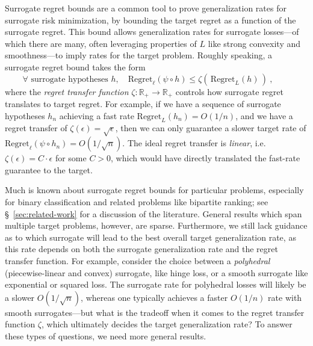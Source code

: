 \documentclass{article}
\theoremstyle{definition}\newtheorem{definition}{Definition}
\theoremstyle{definition}\newtheorem{assumption}{Assumption}
\newcommand{\reals}{\mathbb{R}}
\newcommand{\Reg}{\mathrm{Regret}}
\begin{document}
Surrogate regret bounds are a common tool to prove generalization rates for surrogate risk minimization, by bounding the target regret as a function of the surrogate regret.
This bound allows generalization rates for surrogate losses---of which there are many, often leveraging properties of $L$ like strong convexity and smoothness---to imply rates for the target problem.
Roughly speaking, a surrogate regret bound takes the form
\begin{equation}
  \label{eq:surrogate-regret-bound-informal}
  \forall \text{ surrogate hypotheses } h, \quad \Reg_\ell(\psi\circ h) \leq \zeta(\, \Reg_L(h) \,)~,\qquad
\end{equation}
where the \emph{regret transfer function} $\zeta : \reals_+ \to \reals_+$ controls how surrogate regret translates to target regret.
For example, if we have a sequence of surrogate hypotheses $h_n$ achieving a fast rate $\Reg_L(h_n) = O(1/n)$, and we have a regret transfer of $\zeta(\epsilon) = \sqrt{\epsilon}$, then we can only guarantee a slower target rate of $\Reg_\ell(\psi \circ h_n) = O(1/\sqrt{n})$.
The ideal regret transfer is \emph{linear}, i.e. $\zeta(\epsilon) = C \cdot \epsilon$ for some $C > 0$, which would have directly translated the fast-rate guarantee to the target.

Much is known about surrogate regret bounds for particular problems, especially for binary classification and related problems like bipartite ranking; see \S~\ref{sec:related-work} for a discussion of the literature.
General results which span multiple target problems, however, are sparse.
Furthermore, we still lack guidance as to which surrogate will lead to the best overall target generalization rate, as this rate depends on both the surrogate generalization rate and the regret transfer function.
For example, consider the choice between a \emph{polyhedral} (piecewise-linear and convex) surrogate, like hinge loss, or a smooth surrogate like exponential or squared loss.
The surrogate rate for polyhedral losses will likely be a slower $O(1/\sqrt{n})$, whereas one typically achieves a faster $O(1/n)$ rate with smooth surrogates---but what is the tradeoff when it comes to the regret transfer function $\zeta$, which ultimately decides the target generalization rate?
To answer these types of questions, we need more general results.
\end{document}
